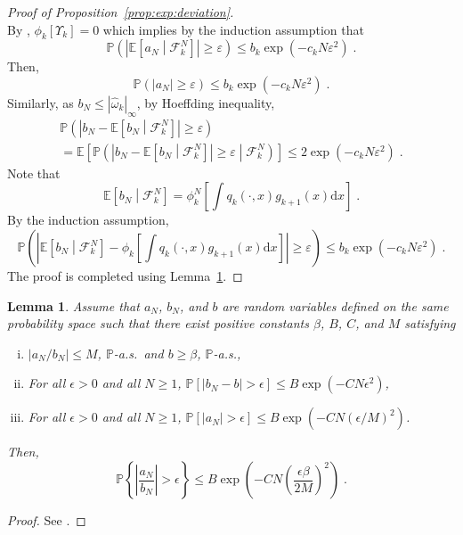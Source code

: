 \documentclass[12pt,draft]{article}
\newcommand{\rmd}{\mathrm{d}}
\newcommand{\eqsp}{\;}
\newcommand{\1}{\mathrm{1}}
\newtheorem{lemma}{Lemma}
\begin{document}
\begin{proof}[Proof of Proposition~\ref{prop:exp:deviation}]
\[\]
By \cite[Lemma~11]{olsson:westerborn:2016}, $\phi_{k}\left[\Upsilon_k\right] = 0$ which implies by the induction assumption that 
\[
\mathbb{P}\left(\left|\mathbb{E}\left[a_N\middle|\mathcal{F}_k^{N}\right]\right|\ge \varepsilon\right)\le b_k\exp\left(-c_kN\varepsilon^2\right)\eqsp.
\]
Then,
\[
\mathbb{P}\left(\left|a_N\right|\ge \varepsilon\right) \le b_k\exp\left(-c_kN\varepsilon^2\right)\eqsp.
\] 
Similarly, as $b_N \le |\widehat{\omega}_k|_{\infty}$, by Hoeffding inequality,
\begin{multline*}
\mathbb{P}\left(\left|b_N - \mathbb{E}\left[b_N\middle|\mathcal{F}_k^{N}\right]\right|\ge \varepsilon\right) \\
= \mathbb{E}\left[\mathbb{P}\left(\left|b_N - \mathbb{E}\left[b_N\middle|\mathcal{F}_k^{N}\right]\right|\ge \varepsilon\middle|\mathcal{F}_k^{N}\right)\right]\le 2\exp\left(-c_kN\varepsilon^2\right)\eqsp.
\end{multline*}
Note that
\[
\mathbb{E}\left[b_N\middle|\mathcal{F}_k^{N}\right] = \phi^N_{k}\left[\int q_{k}(\cdot,x)g_{k+1}(x)\rmd x\right]\eqsp.
\]
By  the induction assumption,
\[
\mathbb{P}\left(\left|\mathbb{E}\left[b_N\middle|\mathcal{F}_k^{N}\right]-\phi_k\left[\int q_{k}(\cdot,x)g_{k+1}(x)\rmd x\right]\right|\ge \varepsilon\right)\le b_k\exp\left(-c_kN\varepsilon^2\right)\eqsp.
\]
The proof is completed using Lemma~\ref{lem:hoeffding:ratio}.
\end{proof}


\begin{lemma}\label{lem:hoeffding:ratio}
Assume that $a_N$, $b_N$, and $b$ are random variables defined on the same probability space such that there exist positive constants $\beta$, $B$, $C$, and $M$ satisfying
\begin{enumerate}[(i)]
    \item $|a_N/b_N|\leq M$, $\mathbb{P}$-a.s.\ and  $b \geq \beta$, $\mathbb{P}$-a.s.,
    \item For all $\epsilon>0$ and all $N\geq1$, $\mathbb{P}\left[|b_N-b|>\epsilon \right]\leq B \exp\left(-C N \epsilon^2\right)$,
    \item For all $\epsilon>0$ and all $N\geq1$, $\mathbb{P} \left[ |a_N|>\epsilon \right]\leq B \exp\left(-C N \left(\epsilon/M\right)^2\right)$.
\end{enumerate}
Then,
$$
    \mathbb{P}\left\{ \left| \frac{a_N}{b_N} \right| > \epsilon \right\} \leq B \exp{\left(-C N \left(\frac{\epsilon \beta}{2M} \right)^2 \right)} \eqsp.
$$
\end{lemma}
\begin{proof}
See \cite{douc:garivier:moulines:olsson:2011}.
\end{proof}





\end{document}
